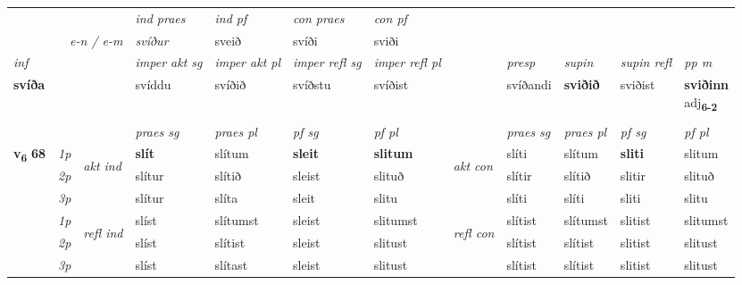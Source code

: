 \begin{longtable}[l]{X>{\footnotesize\itshape}llXXXXlXXXX}
   && &  \textit{ind praes} & \textit{ind pf} & \textit{con praes} & \textit{con pf} \\*
\multicolumn{3}{r}{\textit{e-n  /  e-m}} & svíður & sveið & svíði & sviði \\*

\cmidrule{4-7}
   {\textit{inf}} & &  & \textit{imper akt sg} & \textit{imper akt pl} & \textit{imper refl sg} & \textit{imper refl pl} && \textit{presp} & \textit{supin} & \textit{supin refl} & \textit{pp m} \\*
  {\textbf{svíða}} & && svíddu  & svíðið & svíðstu & svíðist && svíðandi &  \textbf{sviðið} & sviðist & \specialcell{\textbf{sviðinn} \\ adj\textbf{\textsubscript{6-2}}} \\*

\midrule

  & \\
   \midrule
 & &   & \textit{praes sg}  & \textit{praes pl}    & \textit{ pf sg} & \textit{pf pl} & & \textit{praes sg}  & \textit{praes pl}    & \textit{pf sg} & \textit{pf pl }  \\ \cmidrule{4-7} \cmidrule{9-12}
 \multirow{2}{*}{{{\textbf{v{\textsubscript{6}}} \Large{\textbf{68}}}}}  & 1p & \multirow{3}{*}{\begin{turn}{90}\textit{akt ind}\end{turn}} & \textbf{slít} & slítum & \textbf{sleit} & \textbf{slitum} & \multirow{3}{*}{\begin{turn}{90}\textit{akt con}\end{turn}} &slíti & slítum & \textbf{sliti} & slitum\\*
 & 2p &  &  slítur  & slítið & sleist & slituð & & slítir & slítið & slitir & slituð \\*
 & 3p &  & slítur & slíta & sleit & slitu & & slíti & slíti& sliti & slitu \\*
\cmidrule{4-7} \cmidrule{9-12}
 & 1p & \multirow{3}{*}{\begin{turn}{90}\textit{refl ind}\end{turn}}  & slíst & slítumst & sleist & slitumst & \multirow{3}{*}{\begin{turn}{90}\textit{refl con}\end{turn}}  &slítist & slítumst & slitist & slitumst \\*
 & 2p &  & slíst & slítist & sleist & slitust & &slítist & slítist & slitist & slitust \\*
 & 3p  & & slíst & slítast & sleist & slitust & & slítist & slítist& slitist & slitust \\*
\cmidrule{4-7} \cmidrule{9-12}


\end{longtable}
